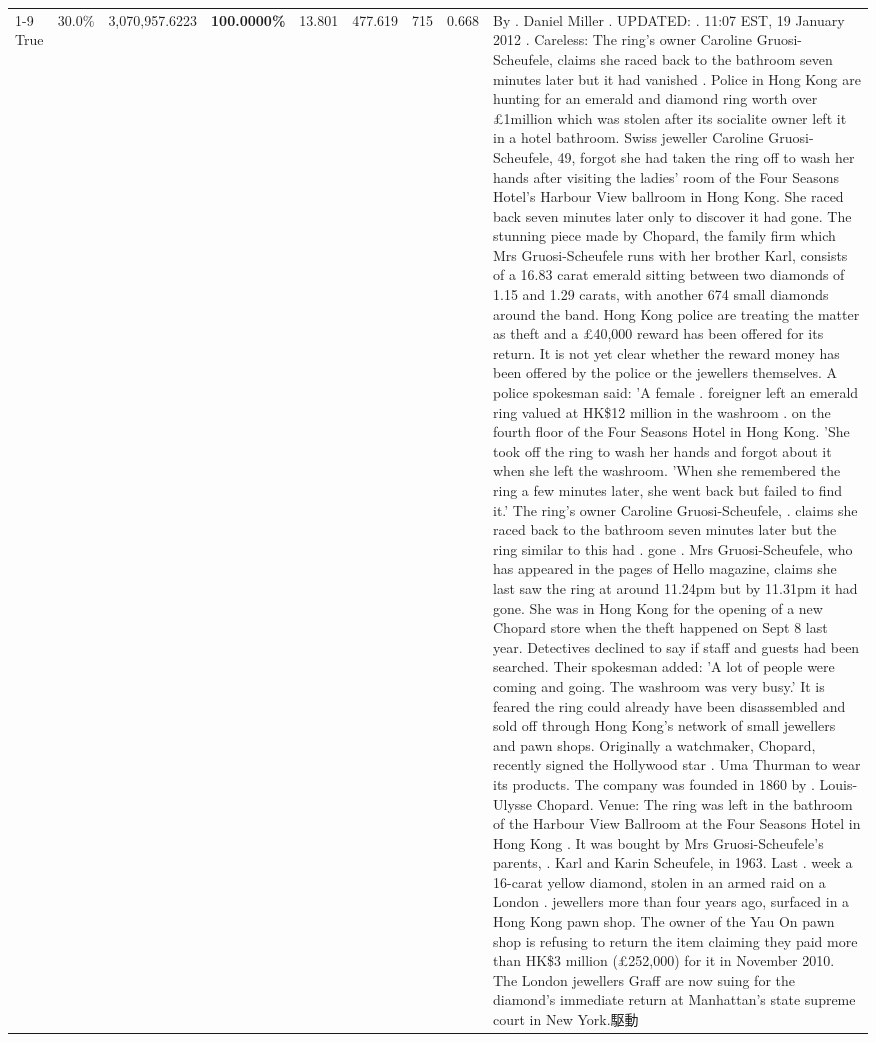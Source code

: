\begin{table}[H]
\begin{tabular}{lllrlllll}
\cline{1-9}
True & 30.0\% & 3,070,957.6223 & \bfseries \color{red} 100.0000\% & 13.801 & 477.619 & 715 & 0.668 & By . Daniel Miller . UPDATED: . 11:07 EST, 19 January 2012 . Careless: The ring's owner Caroline Gruosi-Scheufele, claims she raced back to the bathroom seven minutes later but it had vanished . Police in Hong Kong are hunting for an emerald and diamond ring worth over £1million which was stolen after its socialite owner left it in a hotel bathroom. Swiss jeweller Caroline Gruosi-Scheufele, 49, forgot she had taken the ring off to wash her hands after visiting the ladies' room of the Four Seasons Hotel's Harbour View ballroom in Hong Kong. She raced back seven minutes later only to discover it had gone. The stunning piece made by Chopard, the family firm which Mrs Gruosi-Scheufele runs with her brother Karl, consists of a 16.83 carat emerald sitting between two diamonds of 1.15 and 1.29 carats, with another 674 small diamonds around the band. Hong Kong police are treating the matter as theft and a £40,000 reward has been offered for its return. It is not yet clear whether the reward money has been offered by the police or the jewellers themselves. A police spokesman said: 'A female . foreigner left an emerald ring valued at HK\$12 million in the washroom . on the fourth floor of the Four Seasons Hotel in Hong Kong. 'She took off the ring to wash her hands and forgot about it when she left the washroom. 'When she remembered the ring a few minutes later, she went back but failed to find it.' The ring's owner Caroline Gruosi-Scheufele, . claims she raced back to the bathroom seven minutes later but the ring similar to this had . gone . Mrs Gruosi-Scheufele, who has appeared in the pages of Hello magazine, claims she last saw the ring at around 11.24pm but by 11.31pm it had gone. She was in Hong Kong for the opening of a new Chopard store when the theft happened on Sept 8 last year. Detectives declined to say if staff and guests had been searched. Their spokesman added: 'A lot of people were coming and going. The washroom was very busy.' It is feared the ring could already have been disassembled and sold off through Hong Kong's network of small jewellers and pawn shops. Originally a watchmaker, Chopard, recently signed the Hollywood star . Uma Thurman to wear its products. The company was founded in 1860 by . Louis-Ulysse Chopard. Venue: The ring was left in the bathroom of the Harbour View Ballroom at the Four Seasons Hotel in Hong Kong . It was bought by Mrs Gruosi-Scheufele's  parents, . Karl and Karin Scheufele, in 1963. Last . week a 16-carat yellow diamond, stolen in an armed raid on a London . jewellers more than four years ago, surfaced in a Hong Kong pawn shop. The owner of the Yau On pawn shop is refusing to return the item claiming they paid more than HK\$3 million (£252,000) for it in November 2010. The London jewellers Graff are now suing for the diamond’s immediate return at Manhattan’s state supreme court in New York.駆動 \\

\end{tabular}
\end{table}
